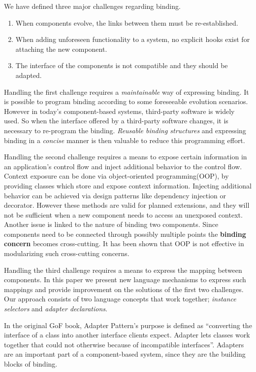 \documentclass{llncs}
\begin{document}
We have defined three major challenges regarding binding. 
\begin{enumerate}
  	\item When components evolve, the links between them
	must be re-established. 
 	 \item When adding unforeseen functionality to a system, no explicit hooks
 	 exist for attaching the new component. 
	\item The interface of the components is not compatible and they should be adapted.
\end{enumerate}

Handling the first challenge requires a \emph{maintainable} way of expressing binding. It is possible to program binding according to some foreseeable evolution scenarios. However in today's component-based systems, third-party software is widely used. So when the interface offered by a third-party software changes, it is necessary to re-program the binding. \emph{Reusable binding structures} and expressing binding in a \emph{concise} manner is then valuable to reduce this programming effort.

Handling the second challenge requires a means to expose certain information in an
application's control flow and inject additional behavior to the control flow. Context exposure can be done via object-oriented programming(OOP), by providing classes which store and expose context information. Injecting additional behavior can be achieved via design patterns like dependency injection or decorator. However these methods are valid for planned extensions, and they will not be sufficient when a new component needs to access an unexposed context. Another issue is linked to the nature of binding two components. Since components need to be connected through possibly multiple points the \textbf{binding concern} becomes cross-cutting. It has been shown that OOP is not effective in modularizing such cross-cutting concerns.  

Handling the third challenge requires a means to express the mapping between components. In this paper we present new language mechanisms to express such mappings and provide improvement on the solutions of the first two challenges. Our approach consists of two language concepts that work together; \emph{instance selectors} and \emph{adapter declarations}. 

In the original GoF book, Adapter Pattern's purpose is defined as ``converting the interface of a class into another interface clients expect. Adapter lets classes work together that could not otherwise because of incompatible interfaces''. Adapters are an important part of a component-based system, since they are the building blocks of binding. 
\end{document}
